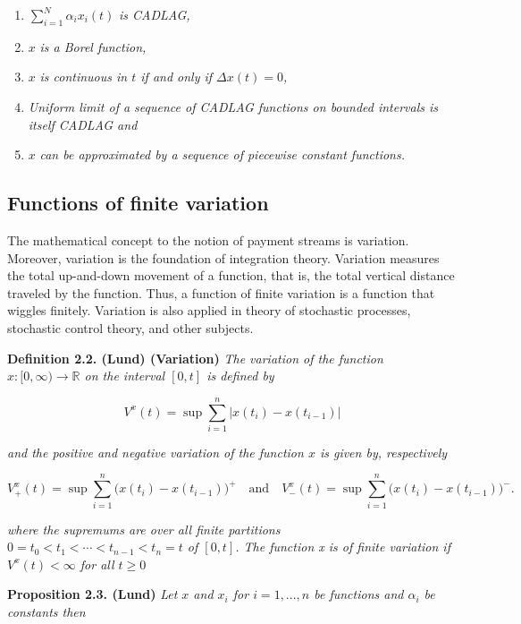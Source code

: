 \documentclass[a4paper,12pt,openany]{book}
\providecommand{\tightlist}{%
 \setlength{\itemsep}{0pt}\setlength{\parskip}{0pt}}
\begin{document}
\begin{enumerate}
\def\labelenumi{\roman{enumi})}
\tightlist
\item
  \(\sum_{i=1}^N \alpha_ix_i(t)\) \emph{is CADLAG,}
\item
  \(x\) \emph{is a Borel function,}
\item
  \(x\) \emph{is continuous in \(t\) if and only if \(\Delta x(t)=0\),}
\item
  \emph{Uniform limit of a sequence of CADLAG functions on bounded intervals is itself CADLAG and}
\item
  \(x\) \emph{can be approximated by a sequence of piecewise constant functions.}
\end{enumerate}

\hypertarget{functions-of-finite-variation}{%
\subsection{Functions of finite variation}\label{functions-of-finite-variation}}

The mathematical concept to the notion of payment streams is variation. Moreover, variation is the foundation of integration theory. Variation measures the total up-and-down movement of a function, that is, the total vertical distance traveled by the function. Thus, a function of finite variation is a function that wiggles finitely. Variation is also applied in theory of stochastic processes, stochastic control theory, and other subjects.

\textbf{Definition 2.2. (Lund) (Variation)} \emph{The variation of the function \(x : [0, \infty) \to\mathbb R\) on the interval \([0, t]\) is defined by}

\[
V^x(t)=\sup\sum_{i=1}^n\vert x(t_i)-x(t_{i-1})\vert
\]

\emph{and the positive and negative variation of the function \(x\) is given by, respectively}

\[
V^x_+(t)=\sup\sum_{i=1}^n\big( x(t_i)-x(t_{i-1})\big)^+\quad \text{and}\quad V^x_-(t)=\sup\sum_{i=1}^n\big( x(t_i)-x(t_{i-1})\big)^-.
\]

\emph{where the supremums are over all finite partitions \(0 = t_0<t_1<\cdots<t_{n-1}<t_n=t\) of \([0,t]\). The function x is of finite variation if \(V^x(t)<\infty\) for all \(t\ge 0\)}

\textbf{Proposition 2.3. (Lund)} \emph{Let \(x\) and \(x_i\) for \(i=1,...,n\) be functions and \(\alpha_i\) be constants then}
\end{document}
